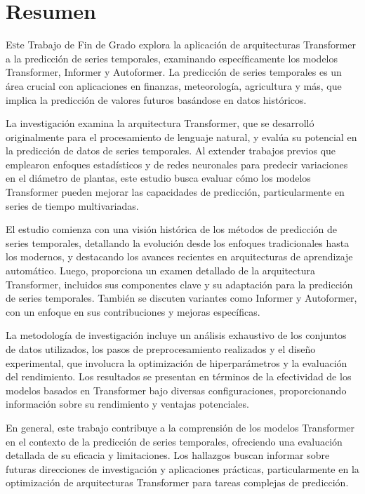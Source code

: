 \chapter*{Resumen}
\pagestyle{especial}
{}

\lettrine[lraise=-0.1, lines=2, loversize=0.2]{E}{s}te Trabajo de Fin de Grado explora la aplicación de arquitecturas Transformer a la predicción de series temporales, examinando específicamente los modelos Transformer, Informer y Autoformer. La predicción de series temporales es un área crucial con aplicaciones en finanzas, meteorología, agricultura y más, que implica la predicción de valores futuros basándose en datos históricos.

La investigación examina la arquitectura Transformer, que se desarrolló originalmente para el procesamiento de lenguaje natural, y evalúa su potencial en la predicción de datos de series temporales. Al extender trabajos previos que emplearon enfoques estadísticos y de redes neuronales para predecir variaciones en el diámetro de plantas, este estudio busca evaluar cómo los modelos Transformer pueden mejorar las capacidades de predicción, particularmente en series de tiempo multivariadas.

El estudio comienza con una visión histórica de los métodos de predicción de series temporales, detallando la evolución desde los enfoques tradicionales hasta los modernos, y destacando los avances recientes en arquitecturas de aprendizaje automático. Luego, proporciona un examen detallado de la arquitectura Transformer, incluidos sus componentes clave y su adaptación para la predicción de series temporales. También se discuten variantes como Informer y Autoformer, con un enfoque en sus contribuciones y mejoras específicas.

La metodología de investigación incluye un análisis exhaustivo de los conjuntos de datos utilizados, los pasos de preprocesamiento realizados y el diseño experimental, que involucra la optimización de hiperparámetros y la evaluación del rendimiento. Los resultados se presentan en términos de la efectividad de los modelos basados en Transformer bajo diversas configuraciones, proporcionando información sobre su rendimiento y ventajas potenciales.

En general, este trabajo contribuye a la comprensión de los modelos Transformer en el contexto de la predicción de series temporales, ofreciendo una evaluación detallada de su eficacia y limitaciones. Los hallazgos buscan informar sobre futuras direcciones de investigación y aplicaciones prácticas, particularmente en la optimización de arquitecturas Transformer para tareas complejas de predicción.

